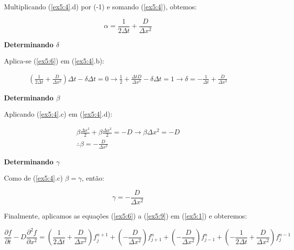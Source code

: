 \documentclass[11pt]{article}
\begin{document}
Multiplicando (\ref{ex5:4}.d) por (-1) e somando (\ref{ex5:4}), obtemos:

\begin{equation}
    \alpha = \frac{1}{2\Delta{t}} + \frac{D}{\Delta{x^2}}
    \label{ex5:6}
\end{equation}

\textbf{Determinando \(\delta\)}

Aplica-se (\ref{ex5:6}) em (\ref{ex5:4}.b):

\begin{equation}
    \begin{aligned}
        (\frac{1}{2\Delta{t}} + \frac{D}{\Delta{x^2}})\Delta{t} - \delta \Delta{t} = 0 \to  \frac{1}{2} + \frac{\Delta{t}D}{\Delta{x^2}} - \delta{\Delta{t}} = 1 \to \delta = -\frac{1}{\Delta{t}} + \frac{D}{\Delta{x^2}}
    \end{aligned}
    \label{ex5:7}
\end{equation}

\textbf{Determinando \(\beta\)}

Aplicando (\ref{ex5:4}.c) em (\ref{ex5:4}.d):

\begin{equation}
    \begin{aligned}
        \beta{\frac{\Delta{x^2}}{2}} + \beta{\frac{\Delta{x^2}}{2}} = -D \to \beta{\Delta{x^2}} = -D \\
        \therefore \beta = -\frac{D}{\Delta{x^2}}
    \end{aligned}
    \label{ex5:8}
\end{equation}

\textbf{Determinando \(\gamma\)}

Como de (\ref{ex5:4}.c) \(\beta = \gamma\), então:

\begin{equation}
    \gamma = -\frac{D}{\Delta{x^2}}
    \label{ex5:9}
\end{equation}

Finalmente, aplicamos as equações (\ref{ex5:6}) a (\ref{ex5:9}) em
(\ref{ex5:1}) e obteremos:

\begin{equation}
\frac{\partial{f}}{\partial{t}} - D\frac{\partial^2{f}}{\partial{x^2}} =
    (\frac{1}{2\Delta{t}} + \frac{D}{\Delta{x^2}})f^{n+1}_{j} +
    (-\frac{D}{\Delta{x^2}})f^{n}_{j+1} +
    (-\frac{D}{\Delta{x^2}})f^{n}_{j-1} +
    (-\frac{1}{2\Delta{t}} + \frac{D}{\Delta{x^2}})f^{n-1}_{j}
    \label{ex5:10}
\end{equation}
\end{document}
